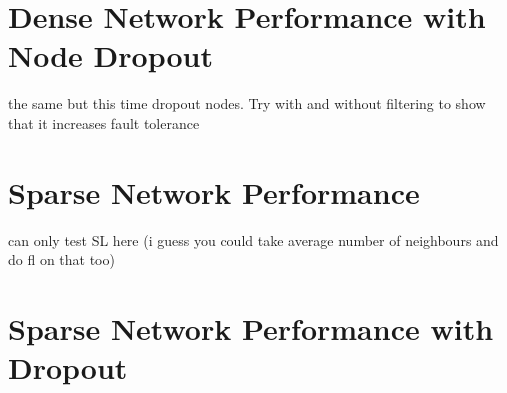\section{Dense Network Performance with Node Dropout}

the same but this time dropout nodes. Try with and without filtering to show that it increases fault tolerance

\section{Sparse Network Performance}

can only test SL here (i guess you could take average number of neighbours and do fl on that too)

\section{Sparse Network Performance with Dropout}